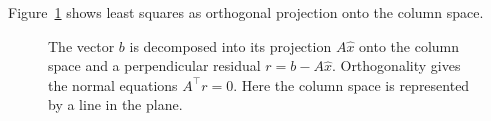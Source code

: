 Figure~\ref{fig:atlas-least-squares-projection} shows least squares as orthogonal projection onto the column space.

\begin{figure}[!htbp]
\centering
{}
\caption{The vector $b$ is decomposed into its projection $A\hat{x}$ onto the column space and a perpendicular residual $r=b-A\hat{x}$. Orthogonality gives the normal equations $A^{\top}r=0$. Here the column space is represented by a line in the plane.}
\label{fig:atlas-least-squares-projection}
\end{figure}